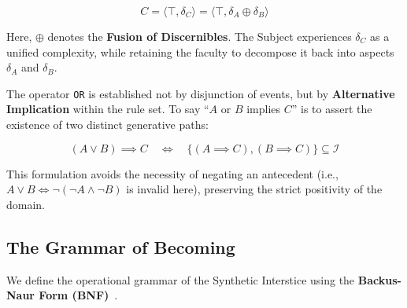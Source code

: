 \documentclass[11pt, a4paper]{article}
\theoremstyle{formalism}
\begin{document}
\begin{equation}
     C = \langle \top, \delta_C \rangle = \langle \top, \delta_A \oplus \delta_B \rangle
\end{equation}

Here, $\oplus$ denotes the \textbf{Fusion of Discernibles}. The Subject experiences $\delta_C$ as a unified complexity, while retaining the faculty to decompose it back into aspects $\delta_A$ and $\delta_B$.

The operator \texttt{OR} is established not by disjunction of events, but by \textbf{Alternative Implication} within the rule set. To say ``$A$ or $B$ implies $C$'' is to assert the existence of two distinct generative paths:

\begin{equation}
    (A \lor B) \implies C \quad \iff \quad \{ (A \implies C), (B \implies C) \} \subseteq \mathcal{I}
\end{equation}

This formulation avoids the necessity of negating an antecedent (i.e., $A \lor B \iff \neg(\neg A \land \neg B)$ is invalid here), preserving the strict positivity of the domain.

\subsection{The Grammar of Becoming}

We define the operational grammar of the Synthetic Interstice using the \textbf{Backus-Naur Form (BNF)}~\cite{Backus1959}.
\end{document}
